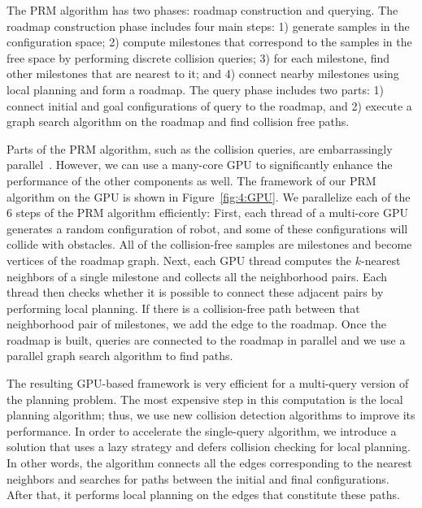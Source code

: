 The PRM algorithm has two phases: roadmap construction and querying. The roadmap construction phase includes four main steps: 1) generate samples in the configuration space; 2) compute milestones that correspond to the samples in the free space by performing discrete collision queries; 3) for each milestone, find other milestones that are nearest to it; and 4) connect nearby milestones using local planning and form a roadmap. The query phase includes two parts: 1) connect initial and goal configurations of query to the roadmap, and 2) execute a graph search algorithm on the roadmap and find collision free paths.

Parts of the PRM algorithm, such as the collision queries, are embarrassingly parallel~\cite{Amato99}. However, we can use a many-core GPU to significantly enhance the performance of the other components as well. The framework of our PRM algorithm on the GPU is shown in Figure~\ref{fig:4:GPU}. We parallelize each of the $6$ steps of the PRM algorithm efficiently: First, each thread of a multi-core GPU generates a random configuration of robot, and some of these configurations will collide with obstacles. All of the collision-free samples are milestones and become vertices of the roadmap graph. Next, each GPU thread computes the $k$-nearest neighbors of a single milestone and collects all the neighborhood pairs. Each thread then checks whether it is possible to connect these adjacent pairs by performing local planning. If there is a collision-free path between that neighborhood pair of milestones, we add the edge to the roadmap. Once the roadmap is built, queries are connected to the roadmap in parallel and we use a parallel graph search algorithm to find paths.

The resulting GPU-based framework is very efficient for a multi-query version of the planning problem. The most expensive step in this computation is the local planning algorithm; thus, we use new collision detection algorithms to improve its performance. In order to accelerate the single-query algorithm, we introduce a solution that uses a lazy strategy and defers collision checking for local planning. In other words, the algorithm connects all the edges corresponding to the nearest neighbors and searches for paths between the initial and final configurations. After that, it performs local planning on the edges that constitute these paths.

